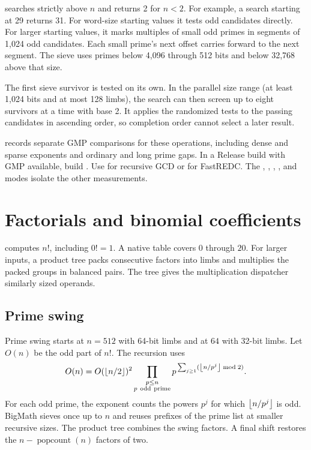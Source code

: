  searches strictly above $n$ and returns
2 for $n<2$. For example, a search starting at 29 returns 31. For
word-size starting values it tests odd candidates directly. For larger
starting values, it marks multiples of small odd primes in segments of
1,024 odd candidates. Each small prime's next offset carries forward to the
next segment. The sieve uses primes below 4,096 through 512 bits and below
32,768 above that size.

The first sieve survivor is tested on its own. In the parallel size range
(at least 1,024 bits and at most 128 limbs), the search can then screen
up to eight survivors at a time with base 2. It applies the randomized
tests to the passing candidates in ascending order, so completion order
cannot select a later result.

\begin{practice}
 records separate GMP comparisons for these operations,
including dense and sparse exponents and ordinary and long prime gaps.
In a Release build with GMP available, build .
Use  for recursive GCD or  for FastREDC.
The , , , , and
 modes isolate the other measurements.
\end{practice}

\newpage
\section{Factorials and binomial coefficients}
\label{sec:combinatorics}

 computes $n!$, including $0!=1$. A native table covers
$0$ through $20$. For larger inputs, a product tree packs consecutive
factors into limbs and multiplies the packed groups in balanced pairs.
The tree gives the multiplication dispatcher similarly sized operands.

\subsection{Prime swing}

Prime swing starts at $n=512$ with 64-bit limbs and at $64$ with
32-bit limbs. Let $O(n)$ be the odd part of $n!$. The recursion uses
\[
  O(n)=O(\left\lfloor n/2 \right\rfloor)^2
  \prod_{\substack{p\le n\\p\ \mathrm{odd\ prime}}}
       p^{\,\sum_{j\ge1}(\left\lfloor n/p^j \right\rfloor\bmod 2)}.
\]
For each odd prime, the exponent counts the powers $p^j$ for which
$\left\lfloor n/p^j \right\rfloor$ is odd. BigMath sieves once up to $n$ and reuses
prefixes of the prime list at smaller recursive sizes. The product
tree combines the swing factors. A final shift restores the
$n-\operatorname{popcount}(n)$ factors of two.

